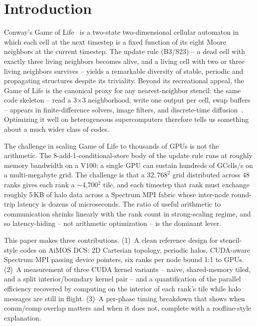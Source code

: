 \documentclass[sigconf,nonacm,10pt]{acmart}
\begin{document}
\section{Introduction}

Conway's Game of Life~\cite{gardner1970} is a two-state two-dimensional
cellular automaton in which each cell at the next timestep is a fixed
function of its eight Moore neighbors at the current timestep. The
update rule (\textsf{B3/S23}) -- a dead cell with exactly three living
neighbors becomes alive, and a living cell with two or three living
neighbors survives -- yields a remarkable diversity of stable, periodic
and propagating structures despite its triviality. Beyond its
recreational appeal, the Game of Life is the canonical proxy for any
nearest-neighbor stencil: the same code skeleton -- read a 3$\times$3
neighborhood, write one output per cell, swap buffers -- appears in
finite-difference solvers, image filters, and discrete-time
diffusion~\cite{datta2008stencil,kamil2010autotune}. Optimizing it well
on heterogeneous supercomputers therefore tells us something about a
much wider class of codes.

The challenge in scaling Game of Life to thousands of GPUs is not the
arithmetic. The 8-add-1-conditional-store body of the update rule
runs at roughly memory bandwidth on a V100; a single GPU can sustain
hundreds of GCells/s on a multi-megabyte grid. The challenge is that a
$32{,}768^{2}$ grid distributed across 48 ranks gives each rank a
$\sim$4{,}700$^{2}$ tile, and each timestep that rank must exchange
roughly 5\,KB of halo data across a Spectrum MPI fabric whose
inter-node round-trip latency is dozens of microseconds. The ratio of
useful arithmetic to communication shrinks linearly with the rank count
in strong-scaling regime, and so latency-hiding -- not arithmetic
optimization -- is the dominant lever.

This paper makes three contributions. (1)~A clean reference design
for stencil-style codes on AiMOS DCS: 2D Cartesian topology, periodic
halos, CUDA-aware Spectrum MPI passing device pointers, six ranks per
node bound 1:1 to GPUs. (2)~A measurement of three CUDA kernel
variants -- naive, shared-memory tiled, and a split interior/boundary
kernel pair -- and a quantification of the parallel efficiency
recovered by computing on the interior of each rank's tile while halo
messages are still in flight. (3)~A per-phase timing breakdown that
shows when comm/comp overlap matters and when it does not, complete
with a roofline-style explanation.
\end{document}
